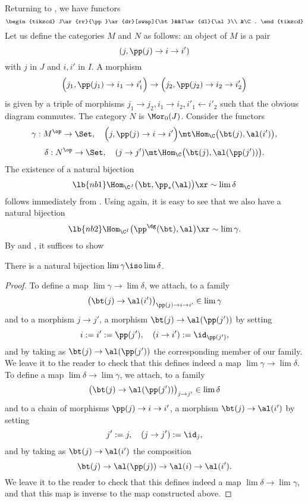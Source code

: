 \documentclass[12pt]{article}
\theoremstyle{remark}
\theoremstyle{definition}
\begin{document}
Returning to , we have functors 
$$
\begin{tikzcd}
J\ar{rr}{\pp}\ar{dr}[swap]{\bt}&&I\ar{dl}{\al}\\ 
&\C.
\end{tikzcd}
$$ 
Let us define the categories $M$ and $N$ as follows: an object of $M$ is a pair 
$$
(j,\pp(j)\to i\to i')
$$ 
with $j$ in $J$ and $i,i'$ in $I$. A morphism 
$$
\Big(j_1,\pp(j_1)\to i_1\to i'_1\Big)\to\Big(j_2,\pp(j_2)\to i_2\to i'_2\Big)
$$ 
is given by a triple of morphisms $j_1\to j_2,i_1\to i_2,i'_1\leftarrow i'_2$ such that the obvious diagram commutes. The category $N$ is $\Mor_0(J)$. Consider the functors 
$$
\gamma:M^{\op}\to\Set,\quad\Big(j,\pp(j)\to i\to i'\Big)\mt\Hom_\C\big(\bt(j),\al(i')\big), 
$$ 
$$
\delta:N^{\op}\to\Set,\quad(j\to j')\mt\Hom_\C\big(\bt(j),\al(\pp(j'))\big). 
$$ 
The existence of a natural bijection 
\begin{equation}\lb{nb1}
\Hom_{\C^J}\big(\bt,\pp_*(\al)\big)\xr\sim\lim\delta
\end{equation} 
follows immediately from . Using  again, it is easy to see that we also have a natural bijection 
\begin{equation}\lb{nb2}
\Hom_{\C^I}\big(\pp^\dg(\bt),\al\big)\xr\sim\lim\gamma.
\end{equation} 
By  and , it suffices to show 

\begin{lem}
There is a natural bijection $\lim\gamma\iso\lim\delta$. 
\end{lem} 

\begin{proof}
To define a map $\lim\gamma\to\lim\delta$, we attach, to a family 
$$
\big(\bt(j)\to\al(i')\big)_{\pp(j)\to i\to i'}\in\lim\gamma
$$ 
and to a morphism $j\to j'$, a morphism $\bt(j)\to\al(\pp(j'))$ by setting 
$$
i:=i':=\pp(j'),\quad(i\to i'):=\id_{\pp(j')},
$$ 
and by taking as $\bt(j)\to\al(\pp(j'))$ the corresponding member of our family. We leave it to the reader to check that this defines indeed a map $\lim\gamma\to\lim\delta$. To define a map $\lim\delta\to\lim\gamma$, we attach, to a family 
$$
\big(\bt(j)\to\al(\pp(j'))\big)_{j\to j'}\in\lim\delta
$$ 
and to a chain of morphisms $\pp(j)\to i\to i'$, a morphism $\bt(j)\to\al(i')$ by setting 
$$
j':=j,\quad(j\to j'):=\id_{j},
$$ 
and by taking as $\bt(j)\to\al(i')$ the composition 
$$
\bt(j)\to\al(\pp(j))\to\al(i)\to\al(i'). 
$$ 
We leave it to the reader to check that this defines indeed a map $\lim\delta\to\lim\gamma$, and that this map is inverse to the map constructed above.
\end{proof}
\end{document}
